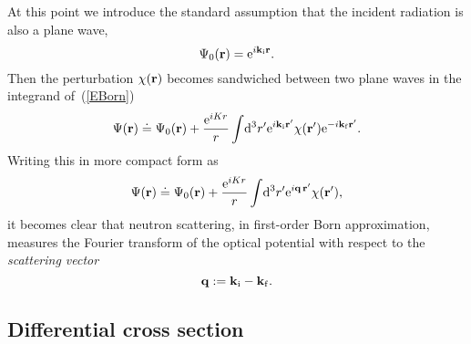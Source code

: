 At this point we introduce the standard assumption
that the incident radiation is also a plane wave,
\begin{equation}\label{EPsi0Plane}
  \Psi_0(\mathbf{r})={\rm e}^{i \mathbf{k}_{\rm i} \mathbf{r}}.
\end{equation}
Then 
the perturbation $\chi(\mathbf{r})$ becomes sandwiched between two plane waves
in the integrand of~(\ref{EBorn})
\begin{equation}\label{Esandwich}
  \Psi(\mathbf{r})
  \doteq \Psi_0(\mathbf{r})
  + \frac{{\rm e}^{iKr}}{r}
    \int\!{\rm d}^3r'
    {\rm e}^{i\mathbf{k}_{\rm i}\mathbf{r}'}\chi(\mathbf{r}'){\rm e}^{-i\mathbf{k}_{\rm f}\mathbf{r}'}.
\end{equation}
Writing this in more compact form as
\begin{equation}\label{EBornPlane}
  \Psi(\mathbf{r})
  \doteq \Psi_0(\mathbf{r})
  + \frac{{\rm e}^{iKr}}{r}
    \int\!{\rm d}^3r' {\rm e}^{i\mathbf{q}\,\mathbf{r}'}\chi(\mathbf{r}'),
\end{equation}
it becomes clear that neutron scattering,
in first-order Born approximation,
measures the Fourier transform
of the optical potential
with respect to the \textit{scattering vector}
\begin{equation}
  \mathbf{q}:=\mathbf{k}_{\rm i}-\mathbf{k}_{\rm f}.
\end{equation}


\subsection{Differential cross section}

